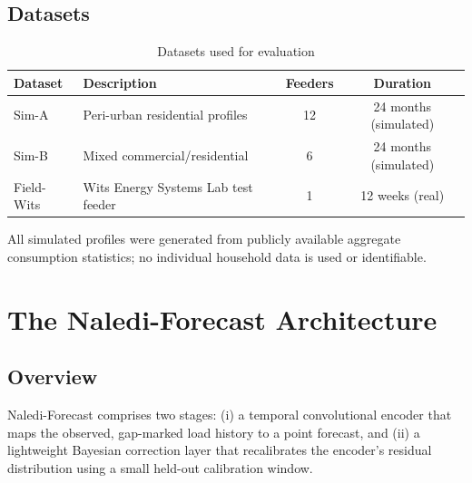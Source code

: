 \documentclass[12pt,a4paper]{report}
\begin{document}
\section{Datasets}
\begin{table}[htbp]
\centering
\caption{Datasets used for evaluation}
\label{tab:datasets}
\begin{tabularx}{\linewidth}{@{}lXcc@{}}
\toprule
\textbf{Dataset} & \textbf{Description} & \textbf{Feeders} & \textbf{Duration} \\
\midrule
Sim-A & Peri-urban residential profiles & 12 & 24 months (simulated) \\
Sim-B & Mixed commercial/residential & 6 & 24 months (simulated) \\
Field-Wits & Wits Energy Systems Lab test feeder & 1 & 12 weeks (real) \\
\bottomrule
\end{tabularx}
\end{table}

\begin{notebox}
All simulated profiles were generated from publicly available aggregate consumption
statistics; no individual household data is used or identifiable.
\end{notebox}

\chapter{The Naledi-Forecast Architecture}

\section{Overview}
Naledi-Forecast comprises two stages: (i) a temporal convolutional encoder that maps the
observed, gap-marked load history to a point forecast, and (ii) a lightweight Bayesian
correction layer that recalibrates the encoder's residual distribution using a small
held-out calibration window.
\end{document}
